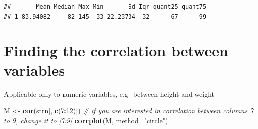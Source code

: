 \documentclass[
]{book}
\newenvironment{Shaded}{\begin{snugshade}}{\end{snugshade}}
\newcommand{\CommentTok}[1]{\textcolor[rgb]{0.56,0.35,0.01}{\textit{#1}}}
\newcommand{\DataTypeTok}[1]{\textcolor[rgb]{0.13,0.29,0.53}{#1}}
\newcommand{\DecValTok}[1]{\textcolor[rgb]{0.00,0.00,0.81}{#1}}
\newcommand{\FloatTok}[1]{\textcolor[rgb]{0.00,0.00,0.81}{#1}}
\newcommand{\KeywordTok}[1]{\textcolor[rgb]{0.13,0.29,0.53}{\textbf{#1}}}
\newcommand{\NormalTok}[1]{#1}
\newcommand{\OperatorTok}[1]{\textcolor[rgb]{0.81,0.36,0.00}{\textbf{#1}}}
\newcommand{\StringTok}[1]{\textcolor[rgb]{0.31,0.60,0.02}{#1}}
\begin{document}
\begin{Shaded}
\end{Shaded}

\begin{verbatim}
##       Mean Median Max Min       Sd Iqr quant25 quant75
## 1 83.94082     82 145  33 22.23734  32      67      99
\end{verbatim}

\hypertarget{finding-the-correlation-between-variables}{%
\section{Finding the correlation between variables}\label{finding-the-correlation-between-variables}}

Applicable only to numeric variables, e.g.~between height and weight

\begin{Shaded}
\begin{Highlighting}[]
\NormalTok{M <-}\StringTok{ }\KeywordTok{cor}\NormalTok{(strn[, }\KeywordTok{c}\NormalTok{(}\DecValTok{7}\OperatorTok{:}\DecValTok{12}\NormalTok{)]) }\CommentTok{# if you are interested in correlation between columns 7 to 9, change it to [7:9]}
\KeywordTok{corrplot}\NormalTok{(M, }\DataTypeTok{method=}\StringTok{"circle"}\NormalTok{)}
\end{Highlighting}
\end{Shaded}
\end{document}
